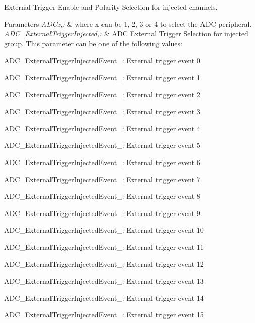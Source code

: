 External Trigger Enable and Polarity Selection for injected channels. 


\begin{DoxyParams}{Parameters}
{\em A\-D\-Cx,\-:} & where x can be 1, 2, 3 or 4 to select the A\-D\-C peripheral. \\
\hline
{\em A\-D\-C\-\_\-\-External\-Trigger\-Injected,\-:} & A\-D\-C External Trigger Selection for injected group. This parameter can be one of the following values\-: \begin{DoxyItemize}
\item A\-D\-C\-\_\-\-External\-Trigger\-Injected\-Event\-\_\-: External trigger event 0 \item A\-D\-C\-\_\-\-External\-Trigger\-Injected\-Event\-\_\-: External trigger event 1 \item A\-D\-C\-\_\-\-External\-Trigger\-Injected\-Event\-\_\-: External trigger event 2 \item A\-D\-C\-\_\-\-External\-Trigger\-Injected\-Event\-\_\-: External trigger event 3 \item A\-D\-C\-\_\-\-External\-Trigger\-Injected\-Event\-\_\-: External trigger event 4 \item A\-D\-C\-\_\-\-External\-Trigger\-Injected\-Event\-\_\-: External trigger event 5 \item A\-D\-C\-\_\-\-External\-Trigger\-Injected\-Event\-\_\-: External trigger event 6 \item A\-D\-C\-\_\-\-External\-Trigger\-Injected\-Event\-\_\-: External trigger event 7 \item A\-D\-C\-\_\-\-External\-Trigger\-Injected\-Event\-\_\-: External trigger event 8 \item A\-D\-C\-\_\-\-External\-Trigger\-Injected\-Event\-\_\-: External trigger event 9 \item A\-D\-C\-\_\-\-External\-Trigger\-Injected\-Event\-\_\-: External trigger event 10 \item A\-D\-C\-\_\-\-External\-Trigger\-Injected\-Event\-\_\-: External trigger event 11 \item A\-D\-C\-\_\-\-External\-Trigger\-Injected\-Event\-\_\-: External trigger event 12 \item A\-D\-C\-\_\-\-External\-Trigger\-Injected\-Event\-\_\-: External trigger event 13 \item A\-D\-C\-\_\-\-External\-Trigger\-Injected\-Event\-\_\-: External trigger event 14 \item A\-D\-C\-\_\-\-External\-Trigger\-Injected\-Event\-\_\-: External trigger event 15 \end{DoxyItemize}

\end{DoxyParams}
